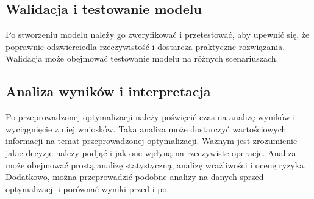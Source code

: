     \subsection{Walidacja i testowanie modelu}
    \par Po stworzeniu modelu należy go zweryfikować i przetestować, aby upewnić się, że poprawnie odzwierciedla rzeczywistość i dostarcza praktyczne rozwiązania. Walidacja może obejmować testowanie modelu na różnych scenariuszach.

    \subsection{Analiza wyników i interpretacja}
    \par Po przeprowadzonej optymalizacji należy poświęcić czas na analizę wyników i wyciągnięcie z niej wniosków. Taka analiza może dostarczyć wartościowych informacji na temat przeprowadzonej optymalizacji. Ważnym jest zrozumienie jakie decyzje należy podjąć i jak one wpłyną na rzeczywiste operacje. Analiza może obejmować prostą analizę statystyczną, analizę wrażliwości i ocenę ryzyka. Dodatkowo, można przeprowadzić podobne analizy na danych sprzed optymalizacji i porównać wyniki przed i po.


